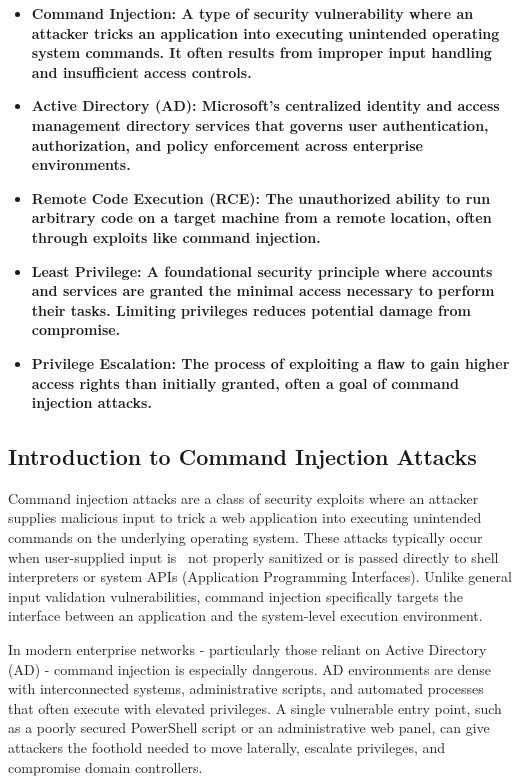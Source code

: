 \begin{itemize}
    \item \textbf{\textbf{Command Injection: }A type of security vulnerability where an attacker tricks an application into executing unintended operating system commands. It often results from improper input handling and insufficient access controls.}
    \item \textbf{\textbf{Active Directory (AD): }Microsoft’s centralized identity and access management directory services that governs user authentication, authorization, and policy enforcement across enterprise environments.}
    \item \textbf{\textbf{Remote Code Execution (RCE): }The unauthorized ability to run arbitrary code on a target machine from a remote location, often through exploits like command injection.}
    \item \textbf{\textbf{Least Privilege: }A foundational security principle where accounts and services are granted the minimal access necessary to perform their tasks. Limiting privileges reduces potential damage from compromise.}
    \item \textbf{\textbf{Privilege Escalation: }The process of exploiting a flaw to gain higher access rights than initially granted, often a goal of command injection attacks.}
\end{itemize}

\subsection{\textbf{Introduction to Command Injection Attacks}}

Command injection attacks are a class of security exploits where an attacker supplies malicious input to trick a web application into executing unintended commands on the underlying operating system. These attacks typically occur when user-supplied input is  not properly sanitized or is passed directly to shell interpreters or system APIs (Application Programming Interfaces). Unlike general input validation vulnerabilities, command injection specifically targets the interface between an application and the system-level execution environment.

In modern enterprise networks - particularly those reliant on Active Directory (AD) - command injection is especially dangerous. AD environments are dense with interconnected systems, administrative scripts, and automated processes that often execute with elevated privileges. A single vulnerable entry point, such as a poorly secured PowerShell script or an administrative web panel, can give attackers the foothold needed to move laterally, escalate privileges, and compromise domain controllers.

